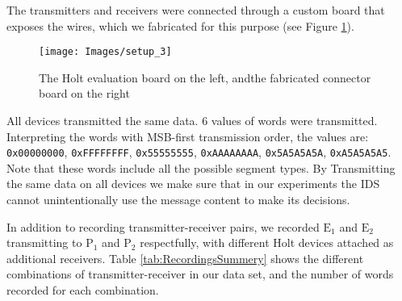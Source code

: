 \documentclass[conference]{IEEEtran}
\begin{document}
  The transmitters and receivers were connected through a custom board that exposes the wires, which we fabricated for this purpose (see Figure \ref{fig:SetupImage}).
  
  \begin{figure}[t]
    \centering
    \texttt{[image: Images/setup\_3]}
    \caption{The Holt evaluation board on the left, andthe fabricated connector board on the right}
    \label{fig:SetupImage}
  \end{figure}
  
  All devices transmitted the same data. 6 values of words were transmitted. Interpreting the words with MSB-first transmission order, the values are: \texttt{0x00000000}, \texttt{0xFFFFFFFF}, \texttt{0x55555555}, \texttt{0xAAAAAAAA}, \texttt{0x5A5A5A5A}, \texttt{0xA5A5A5A5}. Note that these words include all the possible segment types. By Transmitting the same data on all devices we make sure that in our experiments the IDS cannot unintentionally use the message content to make its decisions.
  
  In addition to recording transmitter-receiver pairs, we recorded \(\text{E}_1\) and \(\text{E}_2\) transmitting to \(\text{P}_1\) and \(\text{P}_2\) respectfully, with different Holt devices attached as additional receivers. Table \ref{tab:RecordingsSummery} shows the different combinations of transmitter-receiver in our data set, and the number of words recorded for each combination.
  
\end{document}
